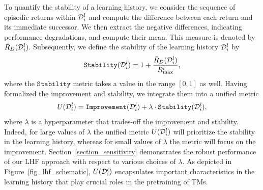 \documentclass{article}
\begin{document}
To quantify the stability of a learning history, we consider the sequence of episodic returns within ${\mathcal D}_i^l$ and compute the difference between each return and its immediate successor. We then extract the negative differences, indicating performance degradations, and compute their mean. This measure is denoted by $\bar{R}_D({\mathcal D}_i^l)$. Subsequently, we define the stability of the learning history ${\mathcal D}_i^l$ by
%
\begin{align}
    \texttt{Stability}({\mathcal D}_i^l) = 1 + \frac{\bar{R}_D({\mathcal D}_i^l)}{R_\text{max}^i},
\end{align}
%
where the $\texttt{Stability}$ metric takes a value in the range $[0, 1]$ as well.
%
Having formalized the improvement and stability, we integrate them into a unified metric
\begin{align}\label{eqn_metric}
    U({\mathcal D}_i^l) = \texttt{Improvement}({\mathcal D}_i^l) + \lambda \cdot \texttt{Stability}({\mathcal D}_i^l),
\end{align}
%
where $\lambda$ is a hyperparameter that trades-off the improvement and stability. Indeed, for large values of $\lambda$ the unified metric $U({\mathcal D}_i^l)$ will prioritize the stability in the learning history, whereas for small values of $\lambda$ the metric will focus on the improvement. Section~\ref{section_sensitivity} demonstrates the robust performance of our LHF approach with respect to various choices of $\lambda$. As depicted in Figure~\ref{fig_lhf_schematic}, $U({\mathcal D}_i^l)$ encapsulates important characteristics in the learning history that play crucial roles in the pretraining of TMs.
\end{document}

